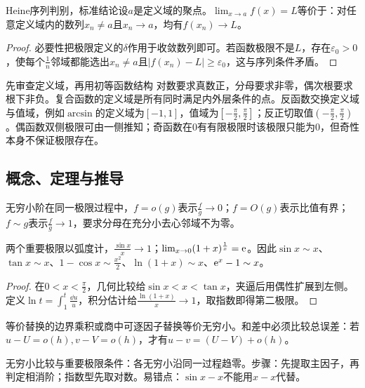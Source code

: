 \begin{theorem}{Heine序列判别，标准结论}设$a$是定义域的聚点。$\lim_{x\to a}f(x)=L$等价于：对任意定义域内的数列$x_n\ne a$且$x_n\to a$，均有$f(x_n)\to L$。\end{theorem}
\begin{proof}必要性把极限定义的$\delta$作用于收敛数列即可。若函数极限不是$L$，存在$\varepsilon_0>0$，使每个$\frac{1}{n}$邻域都能选出$x_n\ne a$且$|f(x_n)-L|\ge\varepsilon_0$，这与序列条件矛盾。\end{proof}
\begin{method}{先审查定义域，再用初等函数结构}
对数要求真数正，分母要求非零，偶次根要求根下非负。复合函数的定义域是所有同时满足内外层条件的点。反函数交换定义域与值域，例如$\arcsin$的定义域为$[-1,1]$，值域为$[-\frac{\pi}{2},\frac{\pi}{2}]$；反正切取值$(-\frac{\pi}{2},\frac{\pi}{2})$。偶函数双侧极限可由一侧推知；奇函数在0有有限极限时该极限只能为0，但奇性本身不保证极限存在。
\end{method}

\subsection{概念、定理与推导}

\begin{definition}{无穷小阶}在同一极限过程中，$f=o(g)$表示$\frac{f}{g}\to0$；$f=O(g)$表示比值有界；$f\sim g$表示$\frac{f}{g}\to1$，要求分母在充分小去心邻域不为零。\end{definition}
\begin{theorem}{两个重要极限}以弧度计，$\frac{\sin x}{x}\to1$；$\lim_{x\to0}(1+x)^{\frac{1}{x}}=\mathrm{e}$。因此$\sin x\sim x$、$\tan x\sim x$、$1-\cos x\sim \frac{x^2}{2}$、$\ln(1+x)\sim x$、$\mathrm{e}^x-1\sim x$。\end{theorem}
\begin{proof}在$0<x<\frac{\pi}{2}$，几何比较给$\sin x<x<\tan x$，夹逼后用偶性扩展到左侧。定义$\ln t=\int_1^t\frac{\dd u}{u}$，积分估计给$\frac{\ln(1+x)}{x}\to1$，取指数即得第二极限。\end{proof}
\begin{corollary}{等价替换的边界}乘积或商中可逐因子替换等价无穷小。和差中必须比较总误差：若$u-U=o(h),v-V=o(h)$，才有$u-v=(U-V)+o(h)$。\end{corollary}

\begin{method}{无穷小比较与重要极限}条件：各无穷小沿同一过程趋零。步骤：先提取主因子，再判定相消阶；指数型先取对数。易错点：$\sin x-x$不能用$x-x$代替。\end{method}
